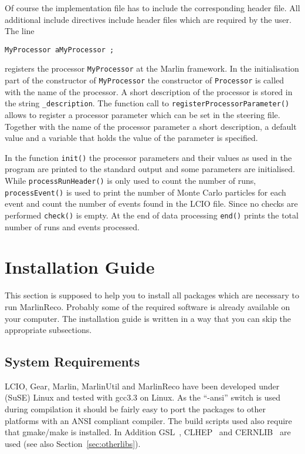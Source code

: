 Of course the implementation file has to include the corresponding
header file. All additional include directives include header files
which are required by the user. The line

\begin{verbatim}
MyProcessor aMyProcessor ;
\end{verbatim}

registers the processor {\tt MyProcessor} at the Marlin framework.
In the initialisation part of the constructor of
{\tt MyProcessor} the constructor of {\tt Processor} is called with the
name of the processor. A short description of the processor is
stored in the string {\tt \_description}. The function call to
{\tt registerProcessorParameter()} allows to register a processor parameter
which can be set in the steering file. Together with the name of the
processor parameter a short description, a default value and a variable
that holds the value of the parameter is specified.

In the function {\tt init()} the processor parameters and their
values as used in the program are printed to the standard output and
some parameters are initialised. While
{\tt processRunHeader()} is only used to count the number of runs,
{\tt processEvent()} is used to print the number of Monte Carlo particles for
each event and count the number of events found in the LCIO file.
Since no checks are performed {\tt check()} is empty.
At the end of data processing {\tt end()} prints the total number of
runs and events processed.

\section{Installation Guide} \label{sec:install}

This section is supposed to help you to install all packages which are
necessary to run MarlinReco. Probably some of the required software is
already available on your computer. The installation guide is written
in a way that you can skip the appropriate subsections.

\subsection{System Requirements}

LCIO, Gear, Marlin, MarlinUtil and MarlinReco have been
developed under (SuSE) Linux and tested with gcc3.3 on Linux.
As the ``-ansi'' switch is used during compilation
it should be fairly easy to
port the packages to other platforms with an ANSI compliant \CPP{} compiler.
The build scripts used also require that gmake/make is installed.
In Addition GSL~\cite{ref_gsl}, CLHEP~\cite{ref_clhep} and
CERNLIB~\cite{ref_cernlib} are used (see also Section~\ref{sec:otherlibs}).


